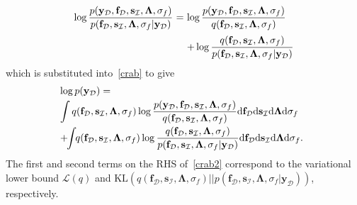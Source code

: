 \documentclass[conference]{IEEEtran}
\begin{document}
	\begin{equation*}
		\begin{array}{rcl}
			\displaystyle	\log \frac{p(\mathbf{y}_\mathcal{D},\mathbf{f}_\mathcal{D},\mathbf{s}_\mathcal{I},\mathbf{\Lambda},\sigma_f)}{p(\mathbf{f}_\mathcal{D},\mathbf{s}_\mathcal{I},\mathbf{\Lambda},\sigma_f|\mathbf{y}_\mathcal{D})}&\hspace{-2.4mm}=&\hspace{-2.4mm}\displaystyle\log\dfrac{p(\mathbf{y}_\mathcal{D},\mathbf{f}_\mathcal{D},\mathbf{s}_\mathcal{I},\mathbf{\Lambda},\sigma_f)}{q(\mathbf{f}_\mathcal{D},\mathbf{s}_\mathcal{I},\mathbf{\Lambda},\sigma_f)}\vspace{1mm}\displaystyle\vspace{1mm}\\
			&&\hspace{-2.4mm}\displaystyle +\log\dfrac{q(\mathbf{f}_\mathcal{D},\mathbf{s}_\mathcal{I},\mathbf{\Lambda},\sigma_f)}{p(\mathbf{f}_\mathcal{D},\mathbf{s}_\mathcal{I},\mathbf{\Lambda},\sigma_f|\mathbf{y}_\mathcal{D})}
		\end{array}
		\vspace{-2mm}
	\end{equation*}
	\vspace{-1mm}
	which is substituted into~\eqref{crab} to give
	\vspace{-1mm}
	\begin{equation}
	\hspace{-1.7mm}
		\begin{array}{l}
			\log p(\mathbf{y}_\mathcal{D})=\vspace{1mm}\\
			\displaystyle\int q(\mathbf{f}_\mathcal{D},\mathbf{s}_\mathcal{I},\mathbf{\Lambda},\sigma_f)\log\dfrac{p(\mathbf{y}_\mathcal{D},\mathbf{f}_\mathcal{D},\mathbf{s}_\mathcal{I},\mathbf{\Lambda},\sigma_f)}{q(\mathbf{f}_\mathcal{D},\mathbf{s}_\mathcal{I},\mathbf{\Lambda},\sigma_f)} \mathrm{d}\mathbf{f}_\mathcal{D} \mathrm{d}\mathbf{s}_\mathcal{I} \mathrm{d}\mathbf{\Lambda} \mathrm{d}\sigma_f \vspace{1mm}\\
			\displaystyle+\hspace{-1mm}\int\hspace{-1mm} q(\mathbf{f}_\mathcal{D},\mathbf{s}_\mathcal{I},\mathbf{\Lambda},\sigma_f)\log\dfrac{q(\mathbf{f}_\mathcal{D},\mathbf{s}_\mathcal{I},\mathbf{\Lambda},\sigma_f)}{p(\mathbf{f}_\mathcal{D},\mathbf{s}_\mathcal{I},\mathbf{\Lambda},\sigma_f|\mathbf{y}_\mathcal{D})} \mathrm{d}\mathbf{f}_\mathcal{D}\mathrm{d}\mathbf{s}_\mathcal{I} \mathrm{d}\mathbf{\Lambda} \mathrm{d}\sigma_f .
		\end{array}
		\label{crab2}\vspace{1mm}
	\end{equation}\vspace{0mm}
	The first and second terms on the RHS of~\eqref{crab2} correspond to the variational lower bound $\mathcal{L}(q)$ and $\mathrm{KL}(q(\mathbf{f}_\mathcal{D},\mathbf{s}_\mathcal{I},\mathbf{\Lambda},\sigma_f)|| p(\mathbf{f}_\mathcal{D},\mathbf{s}_\mathcal{I},\mathbf{\Lambda},\sigma_f|\mathbf{y}_\mathcal{D}))$, respectively.
% 
% 
% 
\vspace{-3mm}
\end{document}
